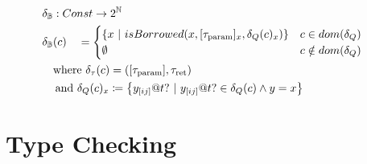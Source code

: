 \begin{alignat*}{3}
	\delta_\mathbb{B} &: \mathrlap{Const \to 2^\mathbb{N}} \\
	\delta_\mathbb{B}&(c) &&= \begin{cases}
		\left\{x \ |\ isBorrowed(x, [\tau_\text{param}]_x, \delta_Q(c)_x) \right\} & c \in dom(\delta_Q) \\
		\emptyset & c \notin dom(\delta_Q)
	\end{cases}\\
	&\mathrlap{\text{where}\ \delta_\tau(c) = ([\tau_\text{param}], \tau_\text{ret})} \\
	&\mathrlap{\hspace{0.2em}\text{and}\ \delta_Q(c)_x \coloneqq \left\{y_{[ij]}@t? \ |\ y_{[ij]}@t? \in \delta_Q(c) \land y = x \right\}}
\end{alignat*}

\section{Type Checking}